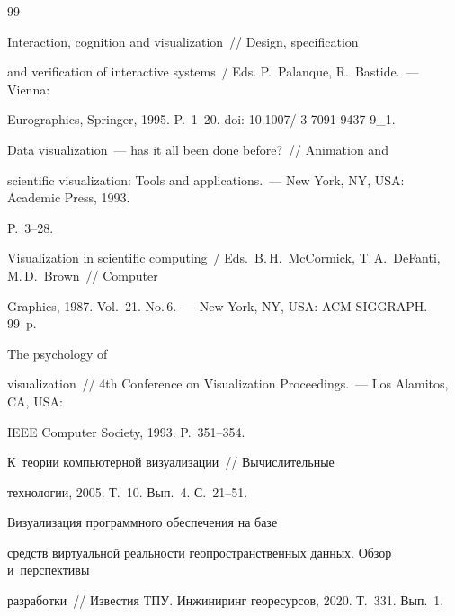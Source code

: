 {\small\frenchspacing

{%


\begin{thebibliography}{99}



\vspace*{-2pt}


 Interaction, cognition and visualization~/\!\!/ Design, specification 

and verification of interactive systems~/ Eds. P.~Palanque, R.~Bastide.~--- Vienna: 

Eurographics, Springer, 1995. P.~1--20. doi: 10.1007\!/-3-7091-9437-9\_1.


 Data visualization~--- has it all been done before?~/\!\!/ Animation and 

scientific visualization: Tools and applications.~--- New York, NY, USA: Academic Press, 1993. 

P.~3--28. 


Visualization in scientific computing~/ Eds.\ B.\,H.~McCormick, T.\,A.~DeFanti, M.\,D.~Brown~/\!\!/ Computer 

Graphics, 1987. Vol.~21. No.\,6.~---  New York, NY, USA: ACM SIGGRAPH. 99~p. 


 The psychology of 

visualization~/\!\!/ 4th Conference on Visualization Proceedings.~--- Los Alamitos, CA, USA: 

IEEE Computer Society, 1993. P.~351--354.


 К~теории компьютерной визуализации~/\!\!/ Вычислительные 

технологии, 2005. Т.~10. Вып.~4. С.~21--51.


 Визуализация программного обеспечения на базе 

средств виртуальной реальности геопространственных данных. Обзор и~перспективы 

разработки~/\!\!/ Известия ТПУ. Инжиниринг георесурсов, 2020. Т.~331. Вып.~1.  


\end{thebibliography}}}
